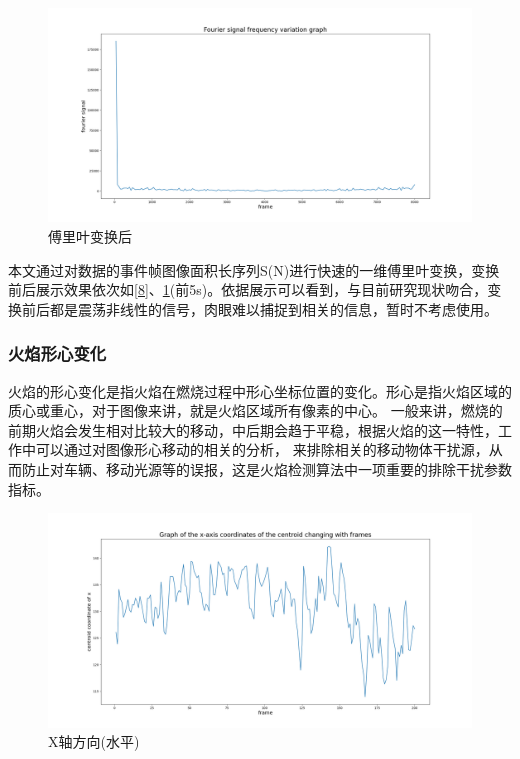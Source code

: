 \begin{figure}[ht]
    \centering
    \includegraphics[width=\textwidth]{figures/extract_flicker_02.png}
    \caption{傅里叶变换后}
    \label{9}
\end{figure}

本文通过对数据的事件帧图像面积长序列S(N)进行快速的一维傅里叶变换，变换前后展示效果依次如\ref{8}、\ref{9}(前5s)。依据展示可以看到，与目前研究现状吻合，变换前后都是震荡非线性的信号，肉眼难以捕捉到相关的信息，暂时不考虑使用。

\subsubsection{火焰形心变化}
火焰的形心变化是指火焰在燃烧过程中形心坐标位置的变化。形心是指火焰区域的质心或重心，对于图像来讲，就是火焰区域所有像素的中心。
一般来讲，燃烧的前期火焰会发生相对比较大的移动，中后期会趋于平稳，根据火焰的这一特性，工作中可以通过对图像形心移动的相关的分析，
来排除相关的移动物体干扰源，从而防止对车辆、移动光源等的误报，这是火焰检测算法中一项重要的排除干扰参数指标。

\begin{figure}[ht]
    \centering
    \includegraphics[width=\textwidth]{figures/extract_centroid_x.png}
    \caption{X轴方向(水平)}
    \label{10}
    \end{figure}


